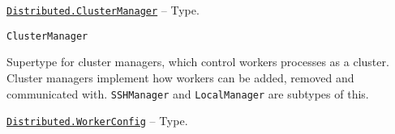 \hypertarget{1673650075671996993}{}
\hyperlink{1673650075671996993}{\texttt{Distributed.ClusterManager}}  -- {Type.}

\begin{adjustwidth}{2em}{0pt}


\begin{verbatim}
ClusterManager
\end{verbatim}

Supertype for cluster managers, which control workers processes as a cluster. Cluster managers implement how workers can be added, removed and communicated with. \texttt{SSHManager} and \texttt{LocalManager} are subtypes of this.



\end{adjustwidth}
\hypertarget{3351347791553517124}{}
\hyperlink{3351347791553517124}{\texttt{Distributed.WorkerConfig}}  -- {Type.}

